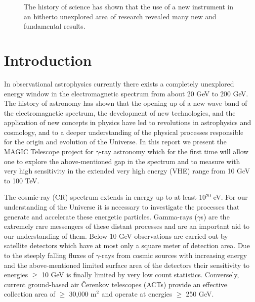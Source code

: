 \renewcommand{\thefootnote}{\arabic{footnote}}
\cleardoublepage
\setcounter{page}{1}
\tableofcontents
\listoffigures
\listoftables
\clearpage
\pagestyle{plain}
{}
\setcounter{page}{0}
\thispagestyle{empty}
\begin{figure}[t]
\leavevmode
\begin{center}
\epsfxsize=16cm

\vspace{0.7cm}
\end{center}
{\large
The history of science has shown that the use of a new instrument in an hitherto
unexplored area of research revealed many new and fundamental results.}
\end{figure}
\newpage

\chapter{Introduction}

\par \medskip In observational astrophysics currently
there exists a completely unexplored energy window 
in the electromagnetic spectrum from
about 20 GeV to 200 GeV.
The history of astronomy has shown that the opening up of a new wave band
of the electromagnetic spectrum, the development of new technologies,
and the application of new concepts in physics have led to revolutions
in astrophysics and cosmology, and to a deeper understanding of the
physical processes responsible for the origin and evolution of the
Universe. In this report we present the MAGIC Telescope project
for $\gamma$-ray astronomy which for the first time will 
allow one to explore the above-mentioned gap in the spectrum
and to measure with very high sensitivity
in the extended very high energy (VHE) range
from 10 GeV to 100 TeV.

The cosmic-ray (CR) spectrum extends in energy up to at  least 10$^{20}$ eV.
For our understanding of the Universe it is necessary to investigate the
processes  that generate and accelerate these energetic particles.
Gamma-rays ($\gamma$s) are the extremely  rare messengers of these distant
processes and are an important aid to our understanding  of them. 
Below 10 GeV observations are carried out by satellite detectors which
have at most only a square meter of detection area.
Due to the steeply falling fluxes of $\gamma$-rays from
cosmic sources with increasing energy
and the above-mentioned limited
surface area of the detectors their sensitivity
to energies $\geq$ 10 GeV 
is finally limited by very low count statistics. Conversely, current
ground-based air \v{C}erenkov telescopes (ACTs) provide
an effective collection area of $\geq$ 30,000 m$^2$ and operate at
energies $\geq$ 250 GeV.


